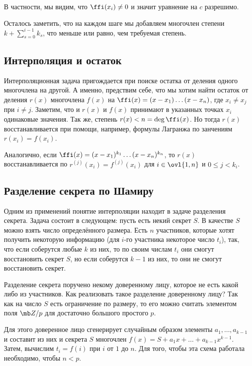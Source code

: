 В частности, мы видим, что $\ffi(x_i)\neq 0$ и значит уравнение на $c$ разрешимо.

Осталось заметить, что на каждом шаге мы добавляем многочлен степени $k+\sum_{s=0}^{i-1} k_s$, что меньше или равно, чем требуемая степень.





\subsection{Интерполяция и остаток}

Интерполяционная задача пригождается при поиске остатка от деления одного многочлена на другой. А именно, предствим себе, что мы хотим найти остаток от деления $r(x)$ многочлена $f(x)$ на $\ffi(x)=(x-x_1)\dots (x-x_n)$, где $x_i\neq x_j$ при $i\neq j$. 
Заметим, что и $r(x)$ и $f(x)$ принимают в указанных точках $x_i$ одинаковые значения. Так же, степень $r(x)< n=\deg \ffi(x)$. Но тогда $r(x)$ восстанавливается при помощи, например, формулы Лагранжа по занчениям $r(x_i)=f(x_i)$.

Аналогично, если $\ffi(x)=(x-x_1)^{k_1}\dots (x-x_n)^{k_n}$, то $r(x)$ восстанавливается по $r^{(j)}(x_i)=f^{(j)}(x_i)$ для $i\in \ovl{1,n}$ и $0\leq j < k_i$.

\subsection{Разделение секрета по Шамиру}
Одним из применений понятие интерполяции находит в задаче разделения секрета. Задача состоит в следующем: пусть есть некий секрет $S$. В качестве $S$ можно взять число определённого размера. Есть $n$ участников, которые хотят получить некоторую информацию (для $i$-го участника некоторое число  $t_i$), так, что если соберутся любые $k$ из них, то по своим числам $t_i$ они смогут восстановить секрет $S$, но если соберутся $k-1$ из них, то они не смогут восстановить секрет.

Разделение секрета поручено некому доверенному лицу, которое не есть какой либо из участников. Как реализовать такое разделение доверенному лицу? Так как на число $S$ есть ограничение по размеру, то его можно считать элементом поля $\mb Z/p$ для достаточно большого простого $p$.

Для этого доверенное лицо сгенерирует случайным образом элементы $a_1,\dots,a_{k-1}$ и составит из них и секрета $S$ многочлен $f(x)=S+a_1x+
\dots+a_{k-1}x^{k-1}$. Затем, вычислим $t_i=f(i)$ при $i$ от $1$ до $n$. Для того, чтобы эта схема работала необходимо, чтобы $n<p$.

